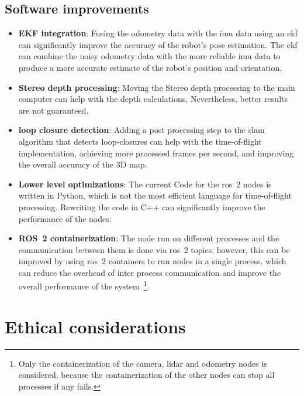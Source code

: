 \section{Software improvements}
\begin{itemize}
  \item \textbf{EKF integration}: Fusing the odometry data with the \gls{imu} data using an \gls{ekf} can significantly improve the accuracy of the robot's pose estimation. The \gls{ekf} can combine the noisy odometry data with the more reliable \gls{imu} data to produce a more accurate estimate of the robot's position and orientation.
  \item \textbf{Stereo depth processing}: Moving the Stereo depth processing to the main computer can help with the depth calculations, Nevertheless, better results are not guaranteed.
  \item \textbf{loop closure detection}: Adding a post processing step to the \gls{slam} algorithm that detects loop-closures can help with the time-of-flight implementation, achieving more processed frames per second, and improving the overall accuracy of the 3D map.
  \item \textbf{Lower level optimizations}: The current Code for the \gls{ros}~2 nodes is written in Python, which is not the most efficient language for time-of-flight processing. Rewriting the code in C++ can significantly improve the performance of the nodes.
  \item \textbf{ROS~2 containerization}: The node run on different processes and the communication between them is done via \gls{ros}~2 topics, however, this can be improved by using \gls{ros}~2 containers to run nodes in a single process, which can reduce the overhead of inter process communication and improve the overall performance of the system~\footnote{Only the containerization of the camera, \gls{lidar} and odometry nodes is considered, because the containerization of the other nodes can stop all processes if any fails.}.
\end{itemize}

\chapter{Ethical considerations}\label{ch:ethics}


